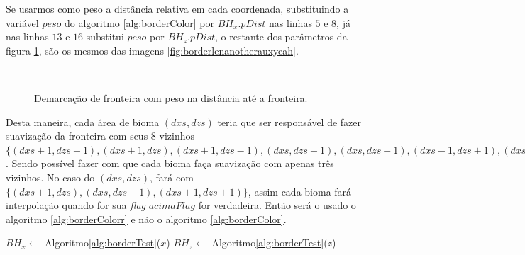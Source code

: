 Se usarmos como peso a distância relativa em cada coordenada, substituindo a variável
$peso$ do algoritmo \ref{alg:borderColor} por $BH_{x}.pDist$ nas linhas $5$ e $8$, já
nas linhas $13$ e $16$ substitui $peso$ por $BH_{z}.pDist$, o restante dos parâmetros
da figura \ref{fig:borderlenanotherauxyeahp}, são os mesmos das imagens \ref{fig:borderlenanotherauxyeah}.

\begin{figure}[H]
     \centering
     \hspace{0.1cm}
     \\
     \caption{Demarcação de fronteira com peso na distância até a fronteira.}
     
     \label{fig:borderlenanotherauxyeahp}
\end{figure}

Desta maneira, cada área de bioma $(dxs, dzs)$ teria que ser responsável de fazer suavização da 
fronteira com seus $8$ vizinhos 
$\{(dxs+1, dzs+1), (dxs+1, dzs), (dxs+1, dzs-1), (dxs, dzs+1), (dxs, dzs-1), (dxs-1, dzs+1), (dxs-1, dzs), (dxs-1, dzs-1)\}$.
Sendo possível fazer com que cada bioma faça suavização com apenas três vizinhos. No caso do 
$(dxs, dzs)$, fará com $\{(dxs+1, dzs), (dxs, dzs+1), (dxs+1, dzs+1)\}$, assim cada 
bioma fará interpolação quando for sua \textit{flag} $acimaFlag$ for verdadeira. Então
será o usado o algoritmo \ref{alg:borderColorr} e não o algoritmo \ref{alg:borderColor}.

\begin{algorithm}[H]\label{alg:borderColorr}%
    $BH_{x} \leftarrow$ Algoritmo\ref{alg:borderTest}($x$)\;
    $BH_{z} \leftarrow$ Algoritmo\ref{alg:borderTest}($z$)\;
    
    
    \caption{Colorindo fronteira apenas acima.}
\end{algorithm}

